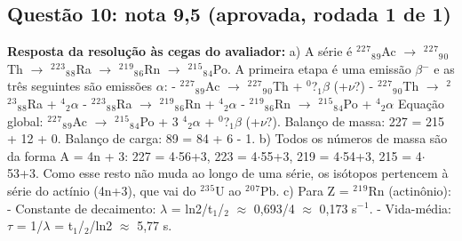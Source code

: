 \documentclass{article}%
\begin{document}
\subsection*{Questão 10: nota 9,5 (aprovada, rodada 1 de 1)}%
\textbf{Resposta da resolução às cegas do avaliador:} a) A série é $^2$$^2$$^{7}$$_{8}$$_{9}$Ac $\to$ $^2$$^2$$^{7}$$_{9}$$_{0}$Th $\to$ $^2$$^2$$^3$$_{8}$$_{8}$Ra $\to$ $^2$$^{1}$$^{9}$$_{8}$$_{6}$Rn $\to$ $^2$$^{1}$$^{5}$$_{8}$$_{4}$Po. A primeira etapa é uma emissão $\beta$$^{-}$ e as três seguintes são emissões $\alpha$:\newline%
{-} $^2$$^2$$^{7}$$_{8}$$_{9}$Ac $\to$ $^2$$^2$$^{7}$$_{9}$$_{0}$Th + $^{0}$?$_{1}$$\beta$ (+$\nu$?)\newline%
{-} $^2$$^2$$^{7}$$_{9}$$_{0}$Th $\to$ $^2$$^2$$^3$$_{8}$$_{8}$Ra + $^{4}$$_{2}$$\alpha$\newline%
{-} $^2$$^2$$^3$$_{8}$$_{8}$Ra $\to$ $^2$$^{1}$$^{9}$$_{8}$$_{6}$Rn + $^{4}$$_{2}$$\alpha$\newline%
{-} $^2$$^{1}$$^{9}$$_{8}$$_{6}$Rn $\to$ $^2$$^{1}$$^{5}$$_{8}$$_{4}$Po + $^{4}$$_{2}$$\alpha$\newline%
\newline%
Equação global: $^2$$^2$$^{7}$$_{8}$$_{9}$Ac $\to$ $^2$$^{1}$$^{5}$$_{8}$$_{4}$Po + 3 $^{4}$$_{2}$$\alpha$ + $^{0}$?$_{1}$$\beta$ (+$\nu$?). Balanço de massa: 227 = 215 + 12 + 0. Balanço de carga: 89 = 84 + 6 - 1.\newline%
\newline%
b) Todos os números de massa são da forma A = 4n + 3: 227 = 4$\cdot$56+3, 223 = 4$\cdot$55+3, 219 = 4$\cdot$54+3, 215 = 4$\cdot$53+3. Como esse resto não muda ao longo de uma série, os isótopos pertencem à série do actínio (4n+3), que vai do $^2$$^3$$^{5}$U ao $^2$$^{0}$$^{7}$Pb.\newline%
\newline%
c) Para Z = $^2$$^{1}$$^{9}$Rn (actinônio):\newline%
{-} Constante de decaimento: $\lambda$ = ln2/t$_{1}$/$_{2}$ $\approx$ 0,693/4 $\approx$ 0,173 s$^{-}$$^{1}$.\newline%
{-} Vida{-}média: $\tau$ = 1/$\lambda$ = t$_{1}$/$_{2}$/ln2 $\approx$ 5,77 s.\newline%
\end{document}
